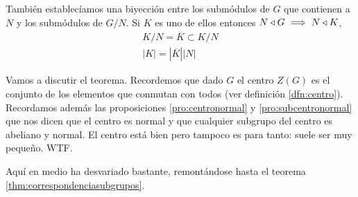 También establecíamos una biyección entre los submódulos de $G$ que contienen a $N$ y los submódulos de $G/N$. Si $K$ es uno de ellos entonces $N \mathbin{\triangleleft} G \implies N \mathbin{\triangleleft} K$,
\begin{align*}
	K/N = \overline{K} \subset K/N \\
	|K| = |\overline{K}||N|
\end{align*}

Vamos a discutir el teorema. Recordemos que dado $G$ el centro $Z(G)$ es el conjunto de los elementos que conmutan con todos (ver definición \ref{dfn:centro}). Recordamos además las proposiciones \ref{pro:centronormal} y \ref{pro:subcentronormal} que nos dicen que el centro es normal y que cualquier subgrupo del centro es abeliano y normal. El centro está bien pero tampoco es para tanto: suele ser muy pequeño. WTF.


Aquí en medio ha desvariado bastante, remontándose hasta el teorema \ref{thm:correspondenciasubgrupos}.

